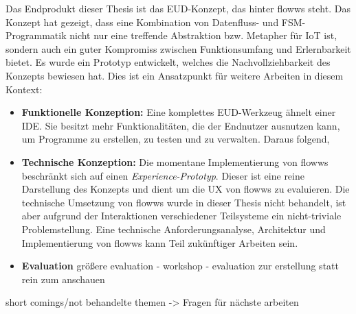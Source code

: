 Das Endprodukt dieser Thesis ist das \ac{EUD}-Konzept, das hinter flowws steht. Das Konzept hat gezeigt, dass eine Kombination von Datenfluss- und \ac{FSM}-Pro\-gram\-ma\-tik nicht nur eine treffende Abstraktion bzw. Metapher für \ac{IoT} ist, sondern auch ein guter Kompromiss zwischen Funktionsumfang und Erlernbarkeit bietet. Es wurde ein Prototyp entwickelt, welches die Nachvollziehbarkeit des Konzepts bewiesen hat. Dies ist ein Ansatzpunkt für weitere Arbeiten in diesem Kontext:

\begin{itemize}
    \item \textbf{Funktionelle Konzeption:} Eine komplettes \ac{EUD}-Werkzeug ähnelt einer \ac{IDE}. Sie besitzt mehr Funktionalitäten, die der Endnutzer ausnutzen kann, um Programme zu erstellen, zu testen und zu verwalten. Daraus folgend, 
    
    \item \textbf{Technische Konzeption:} Die momentane Implementierung von flowws beschränkt sich auf einen \textit{Experience-Prototyp}. Dieser ist eine reine Darstellung des Konzepts und dient um die \ac{UX} von flowws zu evaluieren. Die technische Umsetzung von flowws wurde in dieser Thesis nicht behandelt, ist aber aufgrund der Interaktionen verschiedener Teilsysteme ein nicht-triviale Problemstellung. Eine technische Anforderungsanalyse, Architektur und Implementierung von flowws kann Teil zukünftiger Arbeiten sein. 
    
    \item \textbf{Evaluation} größere evaluation - workshop - evaluation zur erstellung statt rein zum anschauen
\end{itemize}



short comings/not behandelte themen -> Fragen für nächste arbeiten